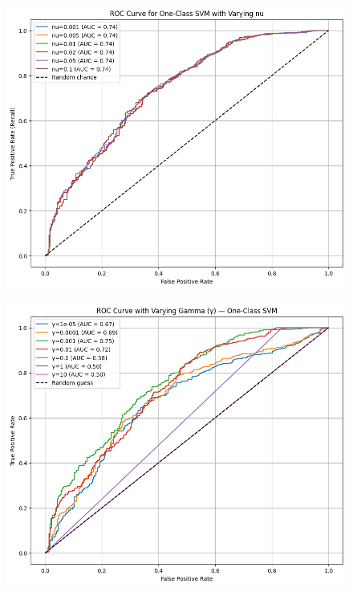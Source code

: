 \documentclass[ngerman]{scrartcl}
\begin{document}
\begin{figure}[htbp]
    \centering
    \begin{minipage}{0.48\textwidth}
        \centering
        \includegraphics[width=\linewidth]{./Figures/vggish_nu.png}
        \label{fig:image1}
    \end{minipage}
    \hfill
    \begin{minipage}{0.48\textwidth}
        \centering
        \includegraphics[width=\linewidth]{./Figures/vggish_gamma.png}
        \label{fig:image2}
    \end{minipage}
    \label{fig:side_by_side}
\end{figure}
\end{document}
